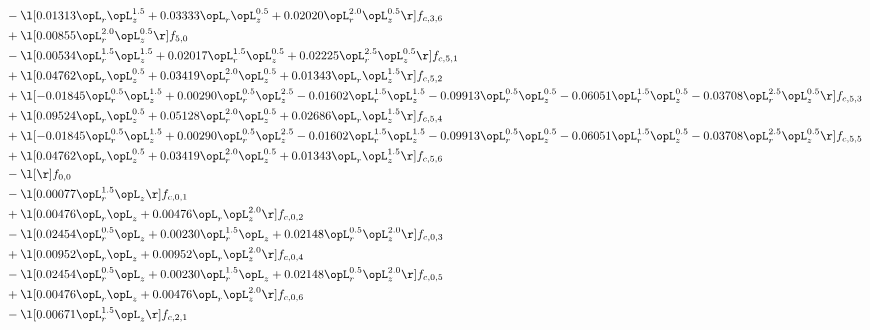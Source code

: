 \begin{alignat}{2}
& - \l[  0.01313 \opL_r \opL_z^{1.5} +  0.03333 \opL_r \opL_z^{0.5} +  0.02020 \opL_r^{2.0} \opL_z^{0.5}  \r] f_{c,3,6} \nonumber \\ 
& + \l[  0.00855 \opL_r^{2.0} \opL_z^{0.5}  \r] f_{5,0} \nonumber \\ 
& - \l[  0.00534 \opL_r^{1.5} \opL_z^{1.5} +  0.02017 \opL_r^{1.5} \opL_z^{0.5} +  0.02225 \opL_r^{2.5} \opL_z^{0.5}  \r] f_{c,5,1} \nonumber \\ 
& + \l[  0.04762 \opL_r \opL_z^{0.5} +  0.03419 \opL_r^{2.0} \opL_z^{0.5} +  0.01343 \opL_r \opL_z^{1.5}  \r] f_{c,5,2} \nonumber \\ 
& + \l[  -0.01845 \opL_r^{0.5} \opL_z^{1.5} +  0.00290 \opL_r^{0.5} \opL_z^{2.5}   -0.01602 \opL_r^{1.5} \opL_z^{1.5}   -0.09913 \opL_r^{0.5} \opL_z^{0.5}   -0.06051 \opL_r^{1.5} \opL_z^{0.5}   -0.03708 \opL_r^{2.5} \opL_z^{0.5}  \r] f_{c,5,3} \nonumber \\ 
& + \l[  0.09524 \opL_r \opL_z^{0.5} +  0.05128 \opL_r^{2.0} \opL_z^{0.5} +  0.02686 \opL_r \opL_z^{1.5}  \r] f_{c,5,4} \nonumber \\ 
& + \l[  -0.01845 \opL_r^{0.5} \opL_z^{1.5} +  0.00290 \opL_r^{0.5} \opL_z^{2.5}   -0.01602 \opL_r^{1.5} \opL_z^{1.5}   -0.09913 \opL_r^{0.5} \opL_z^{0.5}   -0.06051 \opL_r^{1.5} \opL_z^{0.5}   -0.03708 \opL_r^{2.5} \opL_z^{0.5}  \r] f_{c,5,5} \nonumber \\ 
& + \l[  0.04762 \opL_r \opL_z^{0.5} +  0.03419 \opL_r^{2.0} \opL_z^{0.5} +  0.01343 \opL_r \opL_z^{1.5}  \r] f_{c,5,6} \nonumber \\ 
& - \l[  \r] f_{0,0} \nonumber \\ 
& - \l[  0.00077 \opL_r^{1.5} \opL_z  \r] f_{c,0,1} \nonumber \\ 
& + \l[  0.00476 \opL_r \opL_z +  0.00476 \opL_r \opL_z^{2.0}  \r] f_{c,0,2} \nonumber \\ 
& - \l[  0.02454 \opL_r^{0.5} \opL_z +  0.00230 \opL_r^{1.5} \opL_z +  0.02148 \opL_r^{0.5} \opL_z^{2.0}  \r] f_{c,0,3} \nonumber \\ 
& + \l[  0.00952 \opL_r \opL_z +  0.00952 \opL_r \opL_z^{2.0}  \r] f_{c,0,4} \nonumber \\ 
& - \l[  0.02454 \opL_r^{0.5} \opL_z +  0.00230 \opL_r^{1.5} \opL_z +  0.02148 \opL_r^{0.5} \opL_z^{2.0}  \r] f_{c,0,5} \nonumber \\ 
& + \l[  0.00476 \opL_r \opL_z +  0.00476 \opL_r \opL_z^{2.0}  \r] f_{c,0,6} \nonumber \\ 
& - \l[  0.00671 \opL_r^{1.5} \opL_z  \r] f_{c,2,1} \nonumber \\ 

\end{alignat}
